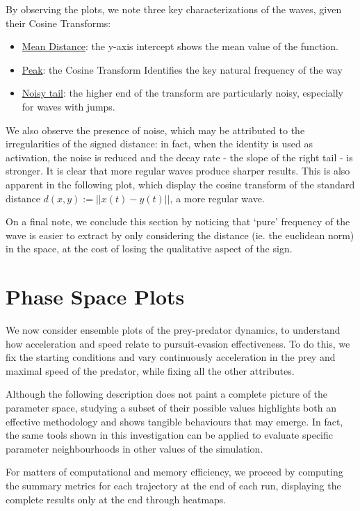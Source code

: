 \documentclass[11pt, twocolumn]{article}
\begin{document}
        By observing the plots, we note three key characterizations of the waves, given their Cosine Transforms:
        \begin{itemize}
          \item \underline{Mean Distance}: the y-axis intercept shows the mean value of the function.
          \item \underline{Peak}: the Cosine Transform Identifies the key natural frequency of the way
          \item \underline{Noisy tail}: the higher end of the transform are particularly noisy, especially for waves with jumps.
        \end{itemize}

        We also observe the presence of noise, which may be attributed to the irregularities of the signed distance: in fact, when the identity is used as activation, the noise is reduced and the decay rate - the slope of the right tail - is stronger. It is clear that more regular waves produce sharper results. This is also apparent in the following plot, which display the cosine transform of the standard distance $d(x,y) := ||x(t)-y(t)||$, a more regular wave.

        On a final note, we conclude this section by noticing that `pure' frequency of the wave is easier to extract by only considering the distance (ie. the euclidean norm) in the space, at the cost of losing the qualitative aspect of the sign.

        \section{Phase Space Plots}
        We now consider ensemble plots of the prey-predator dynamics, to understand how acceleration and speed relate to pursuit-evasion effectiveness. To do this, we fix the starting conditions and vary continuously acceleration in the prey and maximal speed of the predator, while fixing all the other attributes.

        Although the following description does not paint a complete picture of the parameter space, studying a subset of their possible values highlights both an effective methodology and shows tangible behaviours that may emerge. In fact, the same tools shown in this investigation can be applied to evaluate specific parameter neighbourhoods in other values of the simulation.

        For matters of computational and memory efficiency, we proceed by computing the summary metrics for each trajectory at the end of each run, displaying the complete results only at the end through heatmaps.
\end{document}
